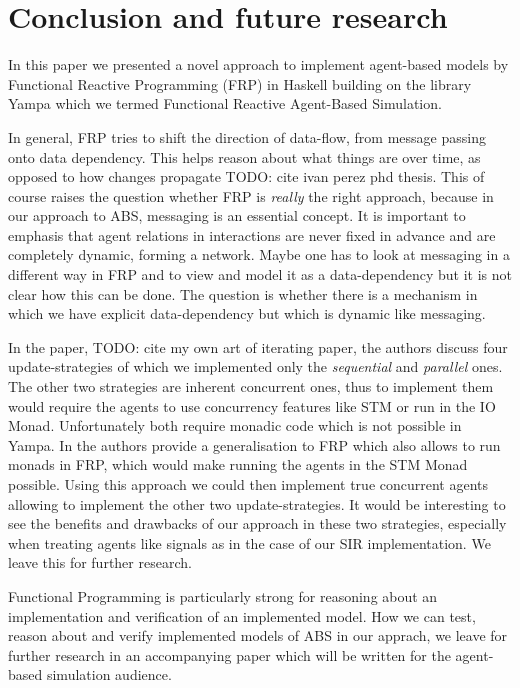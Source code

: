 \section{Conclusion and future research}
In this paper we presented a novel approach to implement agent-based models by Functional Reactive Programming (FRP) in Haskell building on the library Yampa which we termed Functional Reactive Agent-Based Simulation.

In general, FRP tries to shift the direction of data-flow, from message passing onto data dependency. This helps reason about what things are over time, as opposed to how changes propagate TODO: cite ivan perez phd thesis. This of course raises the question whether FRP is \textit{really} the right approach, because in our approach to ABS, messaging is an essential concept. It is important to emphasis that agent relations in interactions are never fixed in advance and are completely dynamic, forming a network. Maybe one has to look at messaging in a different way in FRP and to view and model it as a data-dependency but it is not clear how this can be done. The question is whether there is a mechanism in which we have explicit data-dependency but which is dynamic like messaging.

In the paper, TODO: cite my own art of iterating paper, the authors discuss four update-strategies of which we implemented only the \textit{sequential} and \textit{parallel} ones. The other two strategies are inherent concurrent ones, thus to implement them would require the agents to use concurrency features like STM or run in the IO Monad. Unfortunately both require monadic code which is not possible in Yampa. In \cite{perez_functional_2016} the authors provide a generalisation to FRP which also allows to run monads in FRP, which would make running the agents in the STM Monad possible. Using this approach we could then implement true concurrent agents allowing to implement the other two update-strategies. It would be interesting to see the benefits and drawbacks of our approach in these two strategies, especially when treating agents like signals as in the case of our SIR implementation. We leave this for further research.

Functional Programming is particularly strong for reasoning about an implementation and verification of an implemented model. How we can test, reason about and verify implemented models of ABS in our apprach, we leave for further research in an accompanying paper which will be written for the agent-based simulation audience.